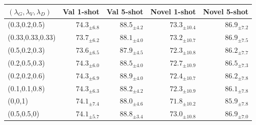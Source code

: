 \begin{tabular}{@{}lrrrr@{}}
\toprule
$(\lambda_G,\lambda_V,\lambda_D)$ & Val 1-shot & Val 5-shot & Novel 1-shot & Novel 5-shot \\
\midrule
(0.3,0.2,0.5) & $74.3_{\pm6.8}$ & $88.5_{\pm4.2}$ & $73.3_{\pm10.4}$ & $86.9_{\pm7.2}$ \\
(0.33,0.33,0.33) & $73.7_{\pm6.2}$ & $88.1_{\pm4.0}$ & $73.2_{\pm10.7}$ & $86.9_{\pm7.5}$ \\
(0.5,0.2,0.3) & $73.6_{\pm6.5}$ & $87.9_{\pm4.5}$ & $72.3_{\pm10.8}$ & $86.2_{\pm7.7}$ \\
(0.2,0.5,0.3) & $74.3_{\pm6.0}$ & $88.5_{\pm4.0}$ & $72.7_{\pm10.9}$ & $86.5_{\pm7.3}$ \\
(0.2,0.2,0.6) & $74.3_{\pm6.9}$ & $88.9_{\pm4.0}$ & $72.4_{\pm10.7}$ & $86.2_{\pm7.8}$ \\
(0.1,0.1,0.8) & $74.3_{\pm6.3}$ & $88.2_{\pm4.2}$ & $72.3_{\pm10.9}$ & $86.1_{\pm7.8}$ \\
(0,0,1) & $74.1_{\pm7.4}$ & $88.0_{\pm4.6}$ & $71.8_{\pm10.2}$ & $85.9_{\pm7.8}$ \\
(0.5,0.5,0) & $74.1_{\pm5.7}$ & $88.8_{\pm3.4}$ & $73.0_{\pm10.8}$ & $86.9_{\pm7.0}$ \\
\bottomrule
\end{tabular}